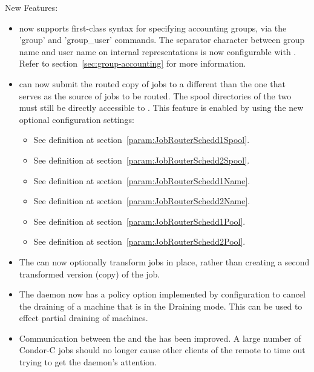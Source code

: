 \noindent New Features:

\begin{itemize}

\item {} now supports first-class syntax for specifying
accounting groups, via the 'group' and 'group\_user' commands.  The
separator character between group name and user name on internal
representations is now configurable with .
Refer to section~\ref{sec:group-accounting} for more information.

\item {} can now submit the routed copy of jobs to a
different  than the one that serves as the source of
jobs to be routed.  The spool directories of the two
 must still be directly accessible to
.  This feature is enabled by using the new
optional configuration settings:

\begin{itemize}
\item {}
See definition at section~\ref{param:JobRouterSchedd1Spool}.
\item {}
See definition at section~\ref{param:JobRouterSchedd2Spool}.
\item {}
See definition at section~\ref{param:JobRouterSchedd1Name}.
\item {}
See definition at section~\ref{param:JobRouterSchedd2Name}.
\item {}
See definition at section~\ref{param:JobRouterSchedd1Pool}.
\item {}
See definition at section~\ref{param:JobRouterSchedd2Pool}.
\end{itemize}

\item The  can now optionally transform jobs in place,
rather than creating a second transformed version (copy) of the job.

\item The  daemon now has a policy option implemented
by configuration to cancel the draining
of a machine that is in the Draining mode.  This can be used to effect
partial draining of machines.

\item Communication between the  and the  has
been improved. A large number of Condor-C jobs should no longer cause
other clients of the remote  to time out trying to get the
 daemon's attention.


\end{itemize}
